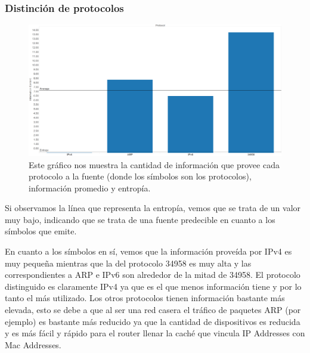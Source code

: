 \documentclass{article}
\theoremstyle{definition}
\theoremstyle{remark}
\begin{document}
\subsubsection{Distinción de protocolos}
\begin{figure}[H]
    \centering
    \includegraphics[width=1\textwidth]{../captures/CasaGerman/Protocol PDF Dashboard.png}
    \caption{Este gráfico nos muestra la cantidad de información que provee cada protocolo a la fuente (donde los símbolos son los protocolos), información promedio y entropía.}
    \label{fig:mesh1}
\end{figure}

Si observamos la línea que representa la entropía, vemos que se trata de un valor muy bajo, indicando que se trata de una fuente predecible en cuanto a los símbolos que emite.

En cuanto a los símbolos en sí, vemos que la información proveída por IPv4 es muy pequeña mientras que la del protocolo 34958 es muy alta y las correspondientes a ARP e IPv6 son alrededor de la mitad de 34958. El protocolo distinguido es claramente IPv4 ya que es el que menos información tiene y por lo tanto el más utilizado. Los otros protocolos tienen información bastante más elevada, esto se debe a que al ser una red casera el tráfico de paquetes ARP (por ejemplo) es bastante más reducido ya que la cantidad de dispositivos es reducida y es más fácil y rápido para el router llenar la caché que vincula IP Addresses con Mac Addresses.
\end{document}
